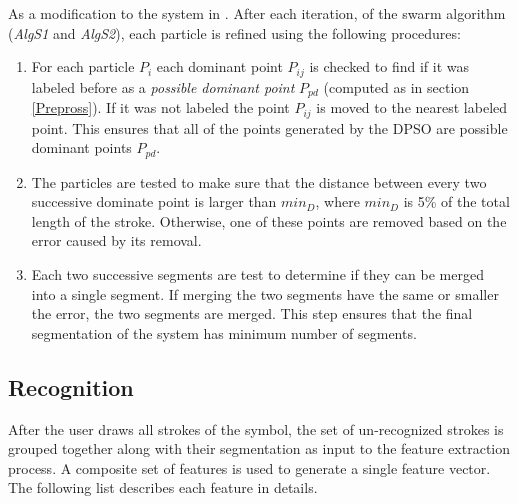 \documentclass[preprint,1p,times,review]{elsarticle}
\begin{document}
 As a modification to the system in \cite{mypaper}. After each iteration, of the swarm algorithm (\textsl{AlgS1} and \textsl{AlgS2}), each particle is refined using the following procedures:
\begin{enumerate}
	\item For each particle $P_i$ each dominant point $P_{ij}$ is checked to find if it was labeled before as a \textit{possible dominant point} $P_{pd}$ (computed as in section \ref{Prepross}). If it was not labeled the point $P_{ij}$ is moved to the nearest labeled point. This ensures that all of the points generated by the DPSO are possible dominant points $P_{pd}$.
 \item The particles are tested to make sure that the distance between every two successive dominate point is larger than $min_D$, where $min_D$ is 5\% of the total length of the stroke.  Otherwise, one of these points are removed based on the error caused by its removal.
 \item Each two successive segments are test to determine if they can be merged into a single segment. If merging the two segments have the same or smaller the error, the two segments are merged. This step ensures that the final segmentation of the system has minimum number of segments.
\end{enumerate}

\subsection{Recognition}
\label{sec:Recognition}

After the user draws all strokes of the symbol, the set of un-recognized strokes is grouped together along with their segmentation as input to the feature extraction process. A composite set of features is used to generate a single feature vector. The following list describes each feature in details.
\end{document}
